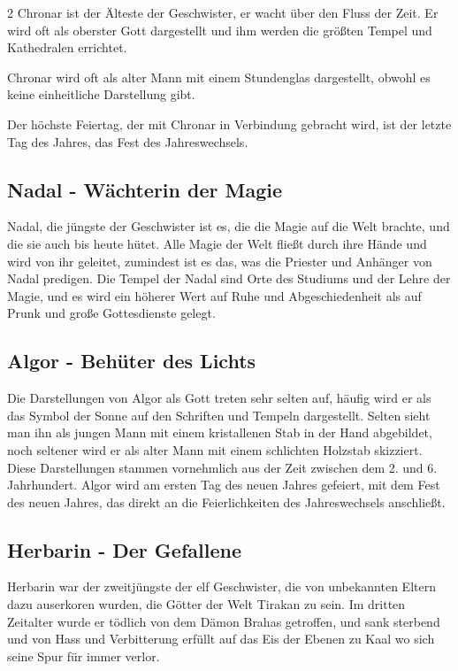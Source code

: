 \begin{multicols*}{2}
Chronar ist der Älteste der Geschwister, er wacht über den Fluss der Zeit.
Er wird oft als oberster Gott dargestellt und ihm werden die größten Tempel und Kathedralen errichtet.

Chronar wird oft als alter Mann mit einem Stundenglas dargestellt, obwohl es keine einheitliche Darstellung gibt.

Der höchste Feiertag, der mit Chronar in Verbindung gebracht wird, ist der letzte Tag des Jahres, das Fest des Jahreswechsels.

\subsection{Nadal - Wächterin der Magie}\label{subsec:nadal-wachterin-der-magie}

Nadal, die jüngste der Geschwister ist es, die die Magie auf die Welt brachte, und die sie auch bis heute hütet.
Alle Magie der Welt fließt durch ihre Hände und wird von ihr geleitet, zumindest ist es das, was die Priester und Anhänger von Nadal predigen.
Die Tempel der Nadal sind Orte des Studiums und der Lehre der Magie, und es wird ein höherer Wert auf Ruhe und Abgeschiedenheit als auf Prunk und große Gottesdienste gelegt.

\subsection{Algor - Behüter des Lichts}\label{subsec:algor-behuter-des-lichts}

Die Darstellungen von Algor als Gott treten sehr selten auf, häufig wird er als das Symbol der Sonne auf den Schriften und Tempeln dargestellt.
Selten sieht man ihn als jungen Mann mit einem kristallenen Stab in der Hand abgebildet, noch seltener wird er als alter Mann mit einem schlichten Holzstab skizziert.
Diese Darstellungen stammen vornehmlich aus der Zeit zwischen dem 2.
und 6. Jahrhundert.
Algor wird am ersten Tag des neuen Jahres gefeiert, mit dem Fest des neuen Jahres, das direkt an die Feierlichkeiten des Jahreswechsels anschließt.

\subsection{Herbarin - Der Gefallene}\label{subsec:herbarin-der-gefallene}

Herbarin war der zweitjüngste der elf Geschwister, die von unbekannten Eltern dazu auserkoren wurden, die Götter der Welt Tirakan zu sein.
Im dritten Zeitalter wurde er tödlich von dem Dämon Brahas getroffen, und sank sterbend und von Hass und Verbitterung erfüllt auf das Eis der Ebenen zu Kaal wo sich seine Spur für immer verlor.


\end{multicols*}
